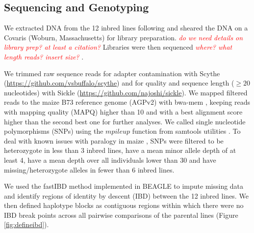 \documentclass[9pt,twocolumn,twoside]{gsajnl}
\newcommand{\yang}[1]{\textcolor{cyan}{\emph{\bf  #1}} }
\newcommand{\jri}[1]{\textcolor{red}{ \emph{ #1}} }
\begin{document}
\subsection*{Sequencing and Genotyping}

We extracted DNA from the 12 inbred lines following \citet{Doyle1987} and sheared the DNA on a Covaris (Woburn, Massachusetts) for library preparation. \jri{do we need details on library prep? at least a citation?}
Libraries were then sequenced \jri{where? what length reads? insert size?}. 

We trimmed  raw sequence reads for adapter contamination with Scythe  (\url{https://github.com/vsbuffalo/scythe}) and for quality and sequence length ($\geq 20$ nucleotides) with Sickle (\url{https://github.com/najoshi/sickle}). 
We mapped filtered reads to the maize B73 reference genome (AGPv2) with bwa-mem \citep{Li2009B}, keeping reads with mapping quality (MAPQ) higher than 10 and with a best alignment score higher than the second best one for further analyses.
We called single nucleotide polymorphisms (SNPs) using the $mpileup$ function from samtools utilities \citep{Li2009}. 
To deal with known issues with paralogy in maize \citep{Chia2012}, SNPs were filtered to be heterozygote in less than 3 inbred lines, have a mean minor allele depth of at least 4, have a mean depth over all individuals lower than 30 and have missing/heterozygote alleles in fewer than 6 inbred lines. 

We used the fastIBD method implemented in BEAGLE \citep{Browning2009} to impute missing data and identify regions of identity by descent (IBD) between the 12 inbred lines. We then defined haplotype blocks as contiguous regions within which there were no IBD break points across all pairwise comparisons of the parental lines (Figure \ref{fig:defineibd}). 


\end{document}

